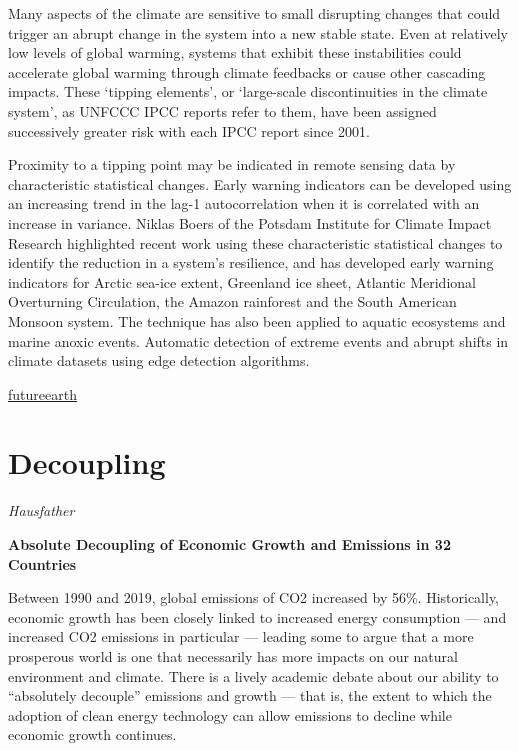 \documentclass[
]{book}
\begin{document}
Many aspects of the climate are sensitive to small disrupting changes that could trigger an abrupt change in the system into a new stable state. Even at relatively low levels of global warming, systems that exhibit these instabilities could accelerate global warming through climate feedbacks or cause other cascading impacts. These `tipping elements', or `large-scale discontinuities in the climate system', as UNFCCC IPCC reports refer to them, have been assigned successively greater risk with each IPCC report since 2001.

Proximity to a tipping point may be indicated in remote sensing data by characteristic statistical changes.
Early warning indicators can be developed using an increasing trend in the lag-1 autocorrelation when it is correlated with an increase in variance.
Niklas Boers of the Potsdam Institute for Climate Impact Research highlighted recent work using these characteristic statistical changes to identify the reduction in a system's resilience, and has developed early warning indicators for Arctic sea-ice extent, Greenland ice sheet, Atlantic Meridional Overturning Circulation, the Amazon rainforest and the South American Monsoon system. The technique has also been applied to aquatic ecosystems and marine anoxic events.
Automatic detection of extreme events and abrupt shifts in climate datasets using edge detection algorithms.

\href{https://futureearth.org/2021/02/22/remote-sensing-of-tipping-points-in-the-climate-system/}{futureearth}

\hypertarget{decoupling}{%
\chapter{Decoupling}\label{decoupling}}

\emph{Hausfather}

\textbf{Absolute Decoupling of Economic Growth and Emissions in 32 Countries}

Between 1990 and 2019, global emissions of CO2 increased by 56\%. Historically, economic growth has been closely linked to increased energy consumption --- and increased CO2 emissions in particular --- leading some to argue that a more prosperous world is one that necessarily has more impacts on our natural environment and climate. There is a lively academic debate about our ability to ``absolutely decouple'' emissions and growth --- that is, the extent to which the adoption of clean energy technology can allow emissions to decline while economic growth continues.
\end{document}
